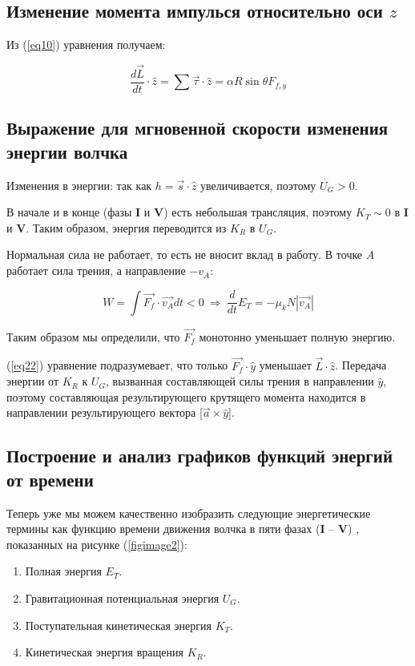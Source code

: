 \documentclass[a4paper,11.5pt]{article} %
\begin{document}
\subsection{Изменение момента импулься относительно оси $z$}

Из (\ref{eq10}) уравнения получаем:

\begin{equation}
\boxed{
	\frac{d\vec{L}}{dt}\cdot \hat{z} = \sum\overrightarrow{\tau} \cdot \hat{z} = \alpha R \sin 	\theta F_{f,y}
}
	\label{eq22}
\end{equation}

\subsection{Выражение для мгновенной скорости изменения энергии волчка}

Изменения в энергии: так как  $h = \vec{s} \cdot \hat{z}$ увеличивается, поэтому $\dot{U_G} > 0$.

В начале и в конце (фазы \textbf{I} и \textbf{V}) есть небольшая трансляция, поэтому $K_T \sim 0$ в \textbf{I} и \textbf{V}. Таким образом, энергия переводится из $K_R$ в $U_G$.

Нормальная сила не работает, то есть не вносит вклад в работу. В точке $A$ работает сила трения, а направление $-v_A$:

\begin{equation}
	W = \int \overrightarrow{F_f} \cdot \overrightarrow{v_A} dt < 0 \ \Rightarrow \ \frac{d}{dt}E_T = -\mu_k N|\overrightarrow{v_A}|
	\label{eq23}
\end{equation}

Таким образом мы определили, что $\overrightarrow{F_f}$ монотонно уменьшает полную энергию.

(\ref{eq22}) уравнение подразумевает, что только $\overrightarrow{F_f} \cdot \hat{y}$ уменьшает $\overrightarrow{L}\cdot \hat{z}$. Передача энергии от $K_R$ к $U_G$, вызванная составляющей силы трения в направлении $\hat{y}$, поэтому составляющая результирующего крутящего момента находится в направлении результирующего вектора [$\vec{a}\times \hat{y}$].


\subsection{Построение и анализ графиков функций энергий от времени}

Теперь уже мы можем качественно изобразить следующие энергетические термины  как функцию времени движения волчка в пяти фазах (\textbf{I} -- \textbf{V}) , показанных на рисунке (\ref{figimage2}):
\begin{enumerate}
	\item Полная энергия $E_T$.
	\item Гравитационная потенциальная энергия $U_G$.
	\item Поступательная кинетическая энергия $K_T$.
	\item Кинетическая энергия вращения $K_R$.
\end{enumerate}
\end{document}
